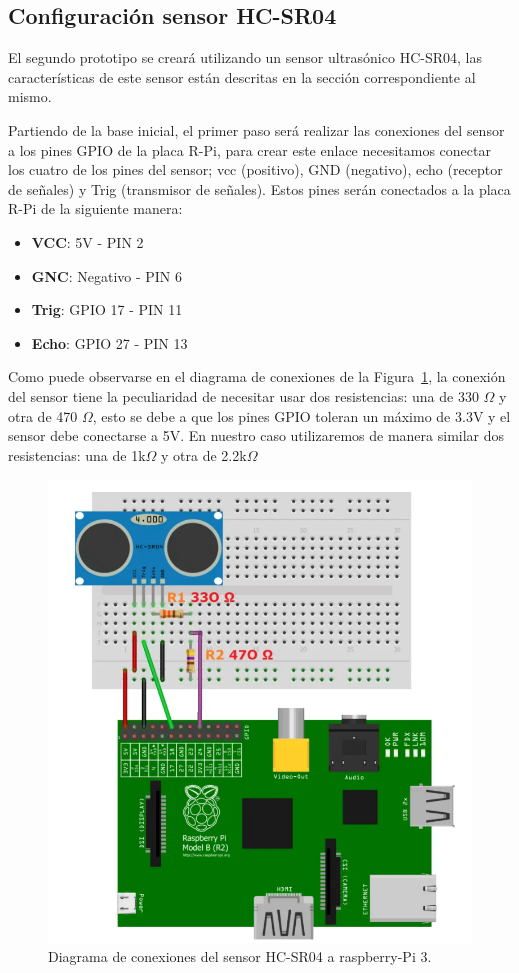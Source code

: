 \subsection{Configuración sensor HC-SR04}

El segundo prototipo se creará utilizando un sensor ultrasónico HC-SR04, las características de este sensor están descritas en la sección correspondiente al mismo. 

Partiendo de la base inicial, el primer paso será realizar las conexiones del sensor a los pines GPIO de la placa R-Pi, para crear este enlace necesitamos conectar los cuatro de los pines del sensor; vcc (positivo), GND (negativo), echo (receptor de señales) y Trig (transmisor de señales). Estos pines serán conectados a la placa R-Pi de la siguiente manera:
\begin{itemize}
    \item \textbf{VCC}: 5V - PIN 2
    \item \textbf{GNC}: Negativo - PIN 6
    \item \textbf{Trig}: GPIO 17 - PIN 11
    \item \textbf{Echo}: GPIO 27 - PIN 13
\end{itemize}
Como puede observarse en el diagrama de conexiones de la Figura~\ref{fig:diagramaConexionesHC}, la conexión del sensor tiene la peculiaridad de necesitar usar dos resistencias: una de 330 \(\Omega\) y otra de 470 \(\Omega\), esto se debe a que los pines GPIO toleran un máximo de 3.3V y el sensor debe conectarse a 5V. En nuestro caso utilizaremos de manera similar dos resistencias: una de 1k\(\Omega\) y otra de 2.2k\(\Omega\)


\begin{figure}[h]
\centering
\includegraphics[scale=0.65]{images/conexionRaspHCSR04.png}
\caption[Conexión HC-SR04 a Raspbery-Pi]{Diagrama de conexiones del sensor HC-SR04 a raspberry-Pi 3.}%
\label{fig:diagramaConexionesHC}
\end{figure}


